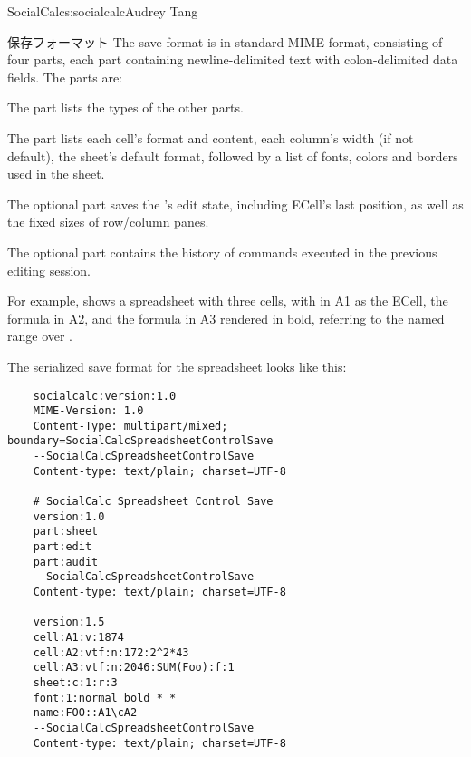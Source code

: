 \begin{aosachapter}{SocialCalc}{s:socialcalc}{Audrey Tang}
\begin{aosasect1}{保存フォーマット}
The save format is in standard MIME  format,
consisting of four  parts, each part
containing newline-delimited text with colon-delimited data fields.
The parts are:

\begin{aosaitemize}

  \item The  part lists the types of the other parts.

  \item The  part lists each cell's format and content, each
  column's width (if not default), the sheet's default format, followed
  by a list of fonts, colors and borders used in the sheet.

  \item The optional  part saves the 's
  edit state, including ECell's last position, as well as the fixed sizes of
  row/column panes.

  \item The optional  part contains the history of
 commands executed in the previous editing session.

\end{aosaitemize}

For example,  shows a spreadsheet with three
cells, with  in A1 as the ECell, the formula 
in A2, and the formula  in A3 rendered in bold,
referring to the named range  over .


The serialized save format for the spreadsheet looks like this:

\begin{verbatim}
    socialcalc:version:1.0
    MIME-Version: 1.0
    Content-Type: multipart/mixed; boundary=SocialCalcSpreadsheetControlSave
    --SocialCalcSpreadsheetControlSave
    Content-type: text/plain; charset=UTF-8

    # SocialCalc Spreadsheet Control Save
    version:1.0
    part:sheet
    part:edit
    part:audit
    --SocialCalcSpreadsheetControlSave
    Content-type: text/plain; charset=UTF-8

    version:1.5
    cell:A1:v:1874
    cell:A2:vtf:n:172:2^2*43
    cell:A3:vtf:n:2046:SUM(Foo):f:1
    sheet:c:1:r:3
    font:1:normal bold * *
    name:FOO::A1\cA2
    --SocialCalcSpreadsheetControlSave
    Content-type: text/plain; charset=UTF-8


\end{verbatim}
\end{aosasect1}
\end{aosachapter}
